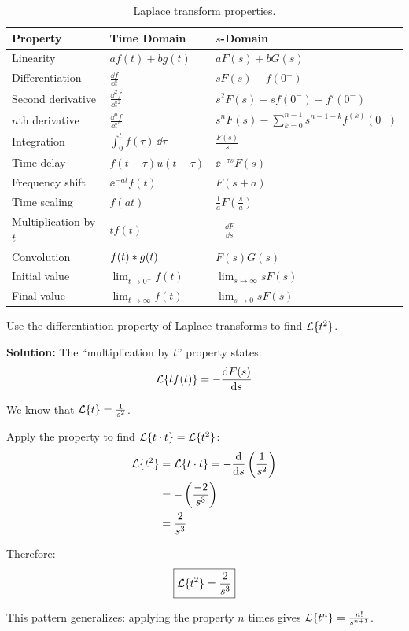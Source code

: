 \begin{table}[htbp]
\centering
\begin{tabular}{lll}
\toprule
\textbf{Property} & \textbf{Time Domain} & \textbf{$s$-Domain} \\
\midrule
Linearity & $af(t) + bg(t)$ & $aF(s) + bG(s)$ \\
Differentiation & $\frac{\dd f}{\dd t}$ & $sF(s) - f(0^-)$ \\
Second derivative & $\frac{\dd^2 f}{\dd t^2}$ & $s^2F(s) - sf(0^-) - f'(0^-)$ \\
$n$th derivative & $\frac{\dd^n f}{\dd t^n}$ & $s^nF(s) - \sum_{k=0}^{n-1} s^{n-1-k}f^{(k)}(0^-)$ \\
Integration & $\int_0^t f(\tau)\,\dd\tau$ & $\frac{F(s)}{s}$ \\
Time delay & $f(t-\tau)u(t-\tau)$ & $\ee^{-\tau s}F(s)$ \\
Frequency shift & $\ee^{-at}f(t)$ & $F(s+a)$ \\
Time scaling & $f(at)$ & $\frac{1}{a}F\left(\frac{s}{a}\right)$ \\
Multiplication by $t$ & $tf(t)$ & $-\frac{\dd F}{\dd s}$ \\
Convolution & $f(t) \ast g(t)$ & $F(s)G(s)$ \\
Initial value & $\lim_{t\to 0^+} f(t)$ & $\lim_{s\to\infty} sF(s)$ \\
Final value & $\lim_{t\to\infty} f(t)$ & $\lim_{s\to 0} sF(s)$ \\
\bottomrule
\end{tabular}
\caption{Laplace transform properties.}
\label{tab:laplace_properties}
\end{table}

\begin{examplebox}[title=Example: Using the Differentiation Property to Find $\Laplace\{t^2\}$]
Use the differentiation property of Laplace transforms to find $\Laplace\{t^2\}$.

\textbf{Solution:}
The ``multiplication by $t$'' property states:
\begin{equation}
\mathcal{L}\{tf(t)\} = -\frac{\mathrm{d} F(s)}{\mathrm{d} s}
\end{equation}

We know that $\mathcal{L}\{t\} = \frac{1}{s^2}$.

Apply the property to find $\mathcal{L}\{t \cdot t\} = \mathcal{L}\{t^2\}$:
\begin{align}
\mathcal{L}\{t^2\} &= \mathcal{L}\{t \cdot t\} = -\frac{\mathrm{d}}{\mathrm{d} s}\left( \frac{1}{s^2} \right) \\
&= -\left( \frac{-2}{s^3} \right) \\
&= \frac{2}{s^3}
\end{align}

Therefore:
\begin{equation}
\boxed{\mathcal{L}\{t^2\} = \frac{2}{s^3}}
\end{equation}

This pattern generalizes: applying the property $n$ times gives $\mathcal{L}\{t^n\} = \frac{n!}{s^{n+1}}$.
\end{examplebox}

